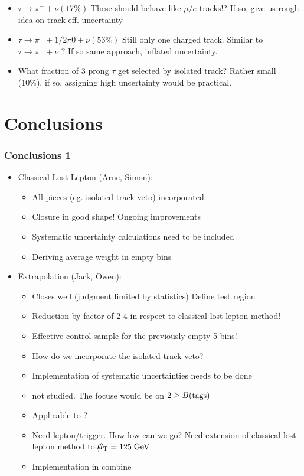 \documentclass{beamer}
\begin{document}
\begin{frame}
\begin{columns}
\begin{column}{0.35\textwidth}
 \end{column}
\end{columns}
\begin{itemize}
 \item $\tau\rightarrow\pi^{-} + \nu (17\%)$ These should behave like $\mu/e$ tracks!? If so, give us rough idea on track eff. uncertainty
   \item $\tau\rightarrow\pi^{-} + 1/2\pi0 + \nu (53\%)$ Still only one charged track. Similar to $\tau\rightarrow\pi^{-} + \nu$ ? If so same approach, inflated uncertainty.
   \item What fraction of 3 prong $\tau$ get selected by isolated track? Rather small (10\%), if so, assigning high uncertainty would be practical.
\end{itemize}
\end{frame}
\section{Conclusions}
\begin{frame}
 \frametitle{Conclusions 1}
 \begin{itemize}
  \item Classical Lost-Lepton (Arne, Simon):
  \begin{itemize}
   \item All pieces (eg. isolated track veto) incorporated
   \item Closure in good shape! Ongoing improvements
   \item Systematic uncertainty calculations need to be included
   \item Deriving average weight in empty bins
  \end{itemize}
  \item \MHT Extrapolation (Jack, Owen):
  \begin{itemize}
   \item Closes well (judgment limited by statistics) Define test region
   \item Reduction by factor of 2-4 in respect to classical lost lepton method!
   \item Effective control sample for the previously empty 5 bins!
   \item How do we incorporate the isolated track veto?
   \item Implementation of systematic uncertainties needs to be done
   \item \wpj not studied. The focuse would be on $2\ge B(\text{tags})$
   \item Applicable to \hadtau?
   \item Need lepton/\met trigger. How low can we go? Need extension of classical lost-lepton method to $\slash\mkern-12mu{H}_{\text{T}} = 125 \;\text{Ge}\kern-0.06667em\text{V}$
   \item Implementation in combine
  \end{itemize}
 \end{itemize}
\end{frame}
\end{document}
